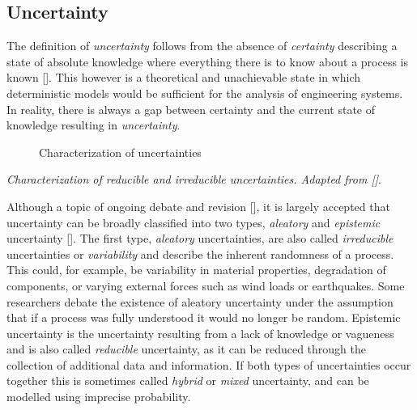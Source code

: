\label{16879307210612674453}{}


\subsection{Uncertainty}



\label{10991333852424530659}{}


The definition of \emph{uncertainty} follows from the absence of \emph{certainty} describing a state of absolute knowledge where everything there is to know about a process is known []. This however is a theoretical and unachievable state in which deterministic models would be sufficient for the analysis of engineering systems. In reality, there is always a gap between certainty and the current state of knowledge resulting in \emph{uncertainty}.



\begin{figure}
\centering
\caption{Characterization of uncertainties}
\end{figure}
 \emph{Characterization of reducible and irreducible uncertainties. Adapted from []}.



Although a topic of ongoing debate and revision [], it is largely accepted that uncertainty can be broadly classified into two types, \emph{aleatory} and \emph{epistemic} uncertainty []. The first type, \emph{aleatory} uncertainties, are also called \emph{irreducible} uncertainties or \emph{variability} and describe the inherent randomness of a process. This could, for example, be variability in material properties, degradation of components, or varying external forces such as wind loads or earthquakes. Some researchers debate the existence of aleatory uncertainty under the assumption that if a process was fully understood it would no longer be random. Epistemic uncertainty is the uncertainty resulting from a lack of knowledge or vagueness and is also called \emph{reducible} uncertainty, as it can be reduced through the collection of additional data and information. If both types of uncertainties occur together this is sometimes called \emph{hybrid} or \emph{mixed} uncertainty, and can be modelled using imprecise probability.



